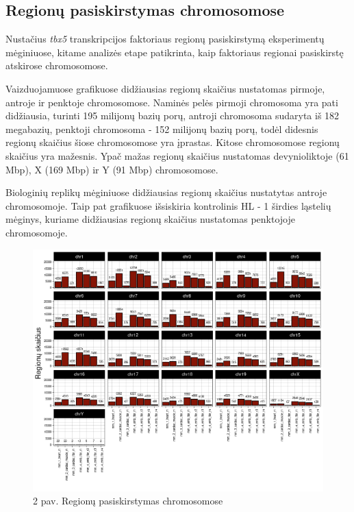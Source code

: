 \documentclass[12pt]{article}
\begin{document}
\newpage

\subsection{Regionų pasiskirstymas chromosomose}
Nustačius \emph{tbx5} transkripcijos faktoriaus regionų
pasiskirstymą eksperimentų mėginiuose, kitame analizės etape
patikrinta, kaip faktoriaus regionai pasiskirstę atskirose
chromosomose.

Vaizduojamuose grafikuose didžiausias regionų skaičius nustatomas
pirmoje, antroje ir penktoje chromosomose. Naminės pelės pirmoji
chromosoma yra pati didžiausia, turinti 195 milijonų bazių porų,
antroji chromosoma sudaryta iš 182 megabazių, penktoji chromosoma -
152 milijonų bazių porų, todėl didesnis regionų skaičius šiose
chromosomose yra įprastas. Kitose chromosomose regionų skaičius
yra mažesnis. Ypač mažas regionų skaičius nustatomas devynioliktoje
(61 Mbp), X (169 Mbp) ir Y (91 Mbp) chromosomose.

Biologinių replikų mėginiuose didžiausias regionų skaičius
nustatytas antroje chromosomoje. Taip pat grafikuose išsiskiria
kontrolinis HL - 1 širdies ląstelių mėginys, kuriame didžiausias
regionų skaičius nustatomas penktojoje chromosomoje.

\begin{figure}[htb]
    \begin{center}
        \includegraphics[width=0.8\linewidth]{Figures/peak_counts_by_chromosome.png}
        \caption*{2 pav. Regionų pasiskirstymas chromosomose}
    \end{center}
\end{figure}
\end{document}
